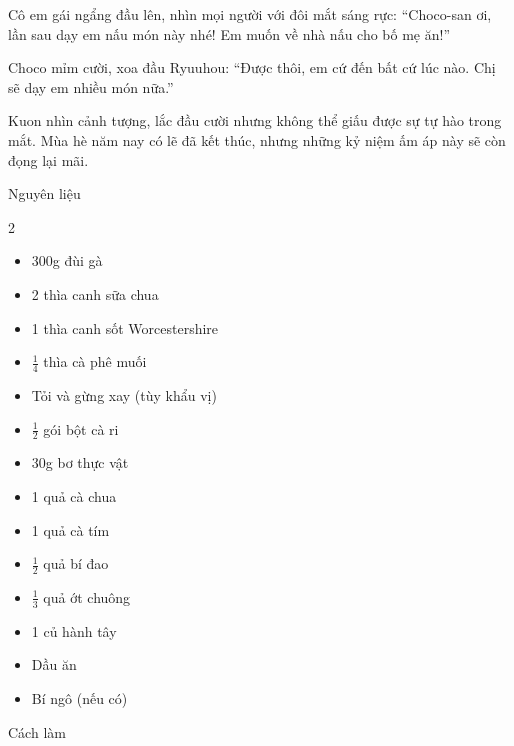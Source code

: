 \documentclass[../main.tex]{subfiles}
\begin{document}
Cô em gái ngẩng đầu lên, nhìn mọi người với đôi mắt sáng rực: ``Choco-san ơi, lần sau dạy em nấu món này nhé! Em muốn về nhà nấu cho bố mẹ ăn!''

Choco mỉm cười, xoa đầu Ryuuhou: ``Được thôi, em cứ đến bất cứ lúc nào. Chị sẽ dạy em nhiều món nữa.''

Kuon nhìn cảnh tượng, lắc đầu cười nhưng không thể giấu được sự tự hào trong mắt. Mùa hè năm nay có lẽ đã kết thúc, nhưng những kỷ niệm ấm áp này sẽ còn đọng lại mãi.

\pagebreak

\begin{center}{\abv\Large Nguyên liệu}\end{center}

\begin{multicols}{2}
    \begin{itemize}
        \item 300g đùi gà
        \item 2 thìa canh sữa chua
        \item 1 thìa canh sốt Worcestershire
        \item \(\frac{1}{4}\) thìa cà phê muối
        \item Tỏi và gừng xay (tùy khẩu vị)
        \item \(\frac{1}{2}\) gói bột cà ri
        \item 30g bơ thực vật
        \item 1 quả cà chua
        \item 1 quả cà tím
        \item \(\frac{1}{2}\) quả bí đao
        \item \(\frac{1}{3}\) quả ớt chuông
        \item 1 củ hành tây
        \item Dầu ăn
        \item Bí ngô (nếu có)
    \end{itemize}
\end{multicols}

\begin{center}{\abv\Large Cách làm}\end{center}
\end{document}
